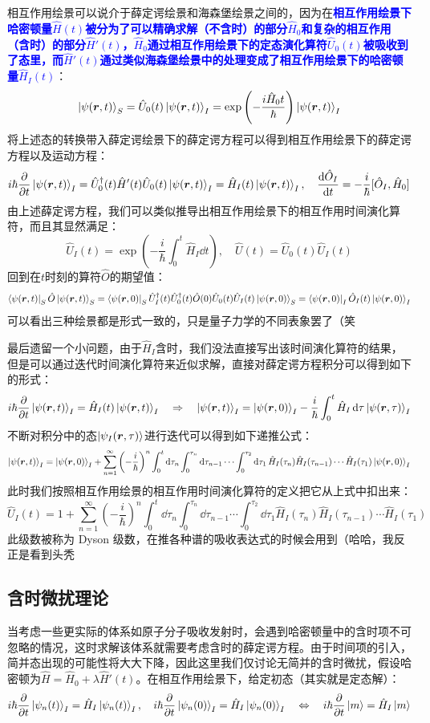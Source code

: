 相互作用绘景可以说介于薛定谔绘景和海森堡绘景之间的，因为在\textcolor{blue}{\textbf{相互作用绘景下哈密顿量$\hat{H}(t)$被分为了可以精确求解（不含时）的部分$\hat{H}_0$和复杂的相互作用（含时）的部分$\hat{H}'(t)$，$\hat{H}_0$通过相互作用绘景下的定态演化算符$\hat{U}_0(t)$被吸收到了态里，而$\hat{H}'(t)$通过类似海森堡绘景中的处理变成了相互作用绘景下的哈密顿量$\hat{H}_I(t)$}}：
\[\ket{\psi(\bm{r},t)}_S=\hat{U}_0(t)\ket{\psi(\bm{r},t)}_I=\exp\left(-\frac{i\hat{H}_0t}{\hbar}\right)\ket{\psi(\bm{r},t)}_I\]
将上述态的转换带入薛定谔绘景下的薛定谔方程可以得到相互作用绘景下的薛定谔方程以及运动方程：
\[i\hbar\pdv{t}\ket{\psi(\bm{r},t)}_I=\hat{U}^{\dagger}_0(t)\hat{H}'(t)\hat{U}_0(t)\ket{\psi(\bm{r},t)}_I=\hat{H}_I(t)\ket{\psi(\bm{r},t)}_I, \quad \dv{\hat{O}_I}{t}=-\frac{i}{\hbar}[\hat{O}_I,\hat{H}_0]\]
由上述薛定谔方程，我们可以类似推导出相互作用绘景下的相互作用时间演化算符，而且其显然满足：
\[\hat{U}_I(t)=\exp\left(-\frac{i}{\hbar}\int_{0}^{t}\hat{H}_I\dd{t}\right), \quad \hat{U}(t)=\hat{U}_0(t)\hat{U}_I(t)\]
回到在$t$时刻的算符$\hat{O}$的期望值：
\[\bra{\psi(\bm{r},t)}_S\hat{O}\ket{\psi(\bm{r},t)}_S=\bra{\psi(\bm{r},0)}_S\hat{U}_I^{\dagger}(t)\hat{U}_0^{\dagger}(t)\hat{O}(0)\hat{U}_0(t)\hat{U}_I(t)\ket{\psi(\bm{r},0)}_S=\bra{\psi(\bm{r},0)}_I\hat{O}_I(t)\ket{\psi(\bm{r},0)}_I\]
可以看出三种绘景都是形式一致的，只是量子力学的不同表象罢了（笑

最后遗留一个小问题，由于$\hat{H}_I$含时，我们没法直接写出该时间演化算符的结果，但是可以通过迭代时间演化算符来近似求解，直接对薛定谔方程积分可以得到如下的形式：
\[i\hbar\pdv{t}\ket{\psi(\bm{r},t)}_I=\hat{H}_I(t)\ket{\psi(\bm{r},t)}_I \quad \Rightarrow \quad \ket{\psi(\bm{r},t)}_I=\ket{\psi(\bm{r},0)}_I-\frac{i}{\hbar}\int_{0}^{t}\hat{H}_I\dd{\tau}\ket{\psi(\bm{r},\tau)}_I\]
不断对积分中的态$\ket{\psi_I(\bm{r},\tau)}$进行迭代可以得到如下递推公式：
\[\ket{\psi(\bm{r},t)}_I=\ket{\psi(\bm{r},0)}_I+\sum_{n=1}^{\infty}\left(-\frac{i}{\hbar}\right)^n\int_{0}^t\dd{\tau_n}\int_{0}^{\tau_n}\dd{\tau_{n-1}}\cdots\int_{0}^{\tau_2}\dd{\tau_1}\hat{H}_I(\tau_n)\hat{H}_I(\tau_{n-1})\cdots\hat{H}_I(\tau_1)\ket{\psi(\bm{r},0)}_I\]
此时我们按照相互作用绘景的相互作用时间演化算符的定义把它从上式中扣出来：
\[\hat{U}_I(t)=1+\sum_{n=1}^{\infty}\left(-\frac{i}{\hbar}\right)^n\int_{0}^t\dd{\tau_n}\int_{0}^{\tau_n}\dd{\tau_{n-1}}\cdots\int_{0}^{\tau_2}\dd{\tau_1}\hat{H}_I(\tau_n)\hat{H}_I(\tau_{n-1})\cdots\hat{H}_I(\tau_1)\]
此级数被称为 Dyson 级数，在推各种谱的吸收表达式的时候会用到（哈哈，我反正是看到头秃

\subsection{含时微扰理论}
当考虑一些更实际的体系如原子分子吸收发射时，会遇到哈密顿量中的含时项不可忽略的情况，这时求解该体系就需要考虑含时的薛定谔方程。由于时间项的引入，简并态出现的可能性将大大下降，因此这里我们仅讨论无简并的含时微扰，假设哈密顿为$\hat{H}=\hat{H}_0+\lambda\hat{H}'(t)$。在相互作用绘景下，给定初态（其实就是定态解）：
\[i\hbar\pdv{t}\ket{\psi_n(t)}_I=\hat{H}_I\ket{\psi_n(t)}_I, \quad i\hbar\pdv{t}\ket{\psi_n(0)}_I=\hat{H}_I\ket{\psi_n(0)}_I \quad \Leftrightarrow \quad i\hbar\pdv{t}\ket{m}=\hat{H}_I\ket{m}\]


